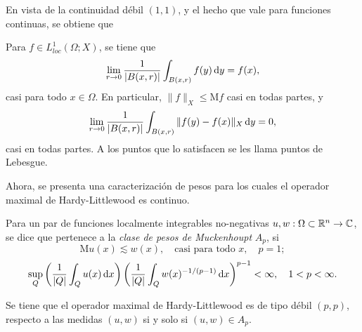 En vista de la continuidad débil $(1, 1)$, y el hecho que vale para funciones continuas, se obtiene que
\begin{corollary}
	Para $f\in L^1_{loc}(\Omega;X)$, se tiene que 
	\begin{equation*}
		\lim_{r\to0}\frac{1}{|B(x, r)|} \int_{B(x, r)} f(y) \mathop{}\!\mathrm{d} y = f(x),
	\end{equation*}
	casi para todo $x\in\Omega$.  En particular, $\|f\|_X\leq \mathrm{M}f$ casi en todas partes, y
	\begin{equation*}
		\lim_{r\to0}\frac{1}{|B(x, r)|} \int_{B(x, r)} \|f(y)-f(x)\|_X \mathop{}\!\mathrm{d} y = 0,
	\end{equation*}
	casi en todas partes. A los puntos que lo satisfacen se les llama puntos de Lebesgue.
\end{corollary}
Ahora, se presenta una caracterización de pesos para los cuales el operador maximal de Hardy-Littlewood es continuo.
\begin{definition}
	Para un par de  funciones localmente integrables no-negativas $u,w:\Omega\subset\mathbb{R}^n\to\mathbb{C}$, se dice que pertenece a la \textit{clase de pesos de Muckenhoupt} $A_p$, si
	\begin{equation*}
		\mathrm{M}u(x) \lesssim w(x), \quad \text{casi para todo }x,\quad p=1;
	\end{equation*}
	\begin{equation*}
		\sup_Q \left(\frac{1}{|Q|}\int_Q u(x)\mathop{}\!\mathrm{d} x \right)\left(\frac{1}{|Q|}\int_Q w(x)^{-1/(p-1)}\mathop{}\!\mathrm{d} x\right)^{p-1} < \infty, \quad 1<p<\infty.
	\end{equation*}
\end{definition}
\begin{theorem}
	Se tiene que el operador maximal de Hardy-Littlewood es de tipo débil $(p,p)$, respecto a las medidas $(u, w)$ si y solo si $(u, w) \in A_p$.
\end{theorem}
